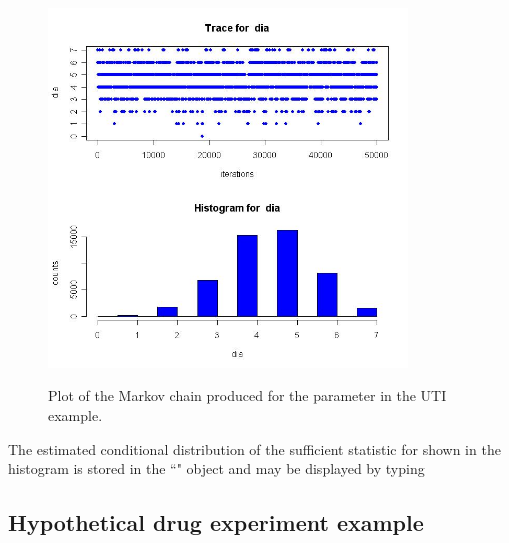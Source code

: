 \documentclass[article, shortnames]{jss}
\begin{document}
\begin{figure}[tb]
\begin{center}
\label{fig1}
\includegraphics[width=0.85\textwidth]{Figures/dia.jpg}
\caption {Plot of the Markov chain produced for the 
parameter in the UTI example.}
\end{center}
\end{figure}

The estimated conditional distribution of the sufficient statistic
for  shown in the histogram is stored in the
``" object and may be displayed by typing
\begin{CodeChunk}
\end{CodeChunk}

\subsection{Hypothetical drug experiment example}
\end{document}
